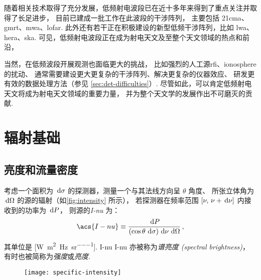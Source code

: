 随着相关技术取得了充分发展，低频射电波段已在近十多年来得到了重点关注并取得了长足进步，
目前已建成一批工作在此波段的干涉阵列，
主要包括 \ac{21cma}、\ac{gmrt}、\ac{mwa}、\ac{lofar}.
此外还有若干正在积极建设的新型低频干涉阵列，比如 \ac{lwa}、\ac{hera}、\ac{ska}.
可见，低频射电波段正在成为射电天文及至整个天文领域的热点和前沿，

当然，在低频波段开展观测也面临更大的挑战，
比如强烈的人工源\ac{rfi}、\ac{ionosphere}的扰动、
通常需要建设更大更复杂的干涉阵列、解决更复杂的仪器效应、
研发更有效的数据处理方法（参见 \autoref{sec:det-difficulties}）.
尽管如此，可以肯定低频射电天文将成为射电天文领域的重要力量，
并为整个天文学的发展作出不可磨灭的贡献.


\section{辐射基础}
\label{sec:radiation}

\subsection{亮度和流量密度}

考虑一个面积为 $\,\mathrm{d}\sigma$ 的探测器，测量一个与其法线方向呈 $\theta$ 角度、
所张立体角为 $\,\mathrm{d}\Omega$ 的源的辐射（如\autoref{fig:intensity} 所示），
若探测器在频率范围 $[\nu, \,\nu+\,\mathrm{d}\nu]$ 内接收到的功率为 $\,\mathrm{d}P$，
则源的\emph{\acf{I-nu}} 为：
\begin{equation}
  \label{eq:intensity}
  \acs{I-nu} \equiv
    \frac{\D{P}}{(\cos\theta\,\D{\sigma}) \,\D{\nu} \,\D{\Omega}} \,,
\end{equation}
其单位是 [\si{\watt\per\square\meter\per\hertz\per\steradian}].
\acl{I-nu} \acs{I-nu} 亦被称为\emph{谱亮度 (spectral brightness)}，
有时也被简称为\emph{强度}或\emph{亮度}.

\begin{figure}[htp]
  \centering
  \texttt{[image: specific-intensity]}
  \label{fig:intensity}
\end{figure}

